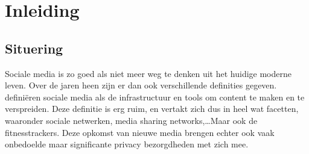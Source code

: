 
\chapter{Inleiding}

\section{Situering}
Sociale media is zo goed als niet meer weg te denken uit het huidige moderne
leven. Over de jaren heen zijn er dan ook verschillende definities gegeven.
\citeauthor{PhilipsAndParks} definiëren sociale media als de infrastructuur en
tools om content te maken en te verspreiden\cite{PhilipsAndParks}. Deze
definitie is erg ruim, en vertakt zich dus in heel wat facetten, waaronder
sociale netwerken, media sharing networks,\ldots Maar ook de fitnesstrackers.
Deze opkomst van nieuwe media brengen echter ook vaak onbedoelde maar
significante privacy bezorgdheden met zich mee.

